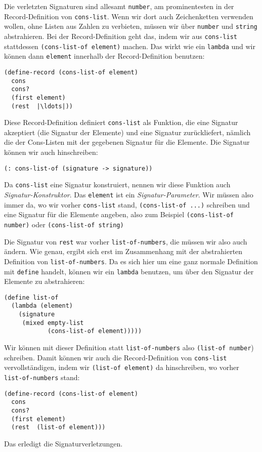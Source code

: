 Die verletzten Signaturen sind allesamt \lstinline{number}, am
prominentesten in der Record-Definition von \lstinline{cons-list}.
Wenn wir dort auch Zeichenketten verwenden wollen, ohne Listen aus
Zahlen zu verbieten, müssen wir über
\lstinline{number} und \lstinline{string} abstrahieren.  Bei der
Record-Definition geht das, indem wir aus \lstinline{cons-list} stattdessen
\lstinline{(cons-list-of element)} machen.
Das wirkt wie ein
\lstinline{lambda} und wir können dann \lstinline{element} innerhalb
der Record-Definition benutzen:
%
\begin{lstlisting}
(define-record (cons-list-of element)
  cons
  cons?
  (first element)
  (rest  |\ldots|))
\end{lstlisting}
%
Diese Record-Definition definiert \lstinline{cons-list} als Funktion,
die eine Signatur akzeptiert (die Signatur der Elemente) und eine
Signatur zurückliefert, nämlich die der Cons-Listen mit der gegebenen
Signatur für die Elemente.  Die Signatur können wir auch hinschreiben:
%
\begin{lstlisting}
(: cons-list-of (signature -> signature))
\end{lstlisting}
%
Da \lstinline{cons-list} eine Signatur konstruiert, nennen wir diese
Funktion auch \textit{Signatur-Konstruktor}.
Das \lstinline{element} ist ein \textit{Signatur-Parameter}.
Wir müssen also immer da, wo wir vorher \lstinline{cons-list} stand,
\lstinline{(cons-list-of ...)} schreiben und eine Signatur für die
Elemente angeben, also zum Beispiel \lstinline{(cons-list-of number)}
oder \lstinline{(cons-list-of string)}

Die Signatur von \lstinline{rest} war vorher
\lstinline{list-of-numbers}, die müssen wir also auch ändern.  Wie
genau, ergibt sich erst im Zusammenhang mit der abstrahierten
Definition von \lstinline{list-of-numbers}.  Da es sich hier um eine
ganz normale Definition mit \lstinline{define} handelt, können wir ein
\lstinline{lambda} benutzen, um über den Signatur der Elemente zu
abstrahieren:
%
\begin{lstlisting}
(define list-of
  (lambda (element)
    (signature
     (mixed empty-list
            (cons-list-of element)))))
\end{lstlisting}
%
Wir können mit dieser Definition statt \lstinline{list-of-numbers} also
\lstinline{(list-of number}) schreiben.  Damit können wir auch die
Record-Definition von \lstinline{cons-list} vervollständigen, indem
wir \lstinline{(list-of element)} da hinschreiben, wo vorher
\lstinline{list-of-numbers} stand:
%
\begin{lstlisting}
(define-record (cons-list-of element)
  cons
  cons?
  (first element)
  (rest  (list-of element)))
\end{lstlisting}
%
Das erledigt die Signaturverletzungen.

